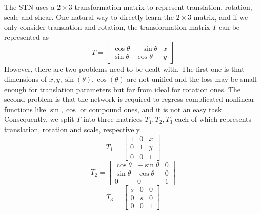 \documentclass[10pt,conference,a4paper]{IEEEtran}
\begin{document}
	The STN uses a $2 \times 3$ transformation matrix to represent translation, rotation, scale and shear. One natural way to directly learn the $2 \times 3$ matrix, and if we only consider translation and rotation, the transformation matrix $T$ can be represented as 
	\begin{equation}
		T = 
		\begin{bmatrix}
		\cos\theta & -\sin\theta & x\\ 
		\sin\theta & \cos\theta & y
		\end{bmatrix}
	\end{equation}
	However, there are two problems need to be dealt with. The first one is that dimensions of $x, y, \sin(\theta), \cos(\theta)$ are not unified and the loss may be small enough for translation parameters but far from ideal for rotation ones. The second problem is that the network is required to regress complicated nonlinear functions like $\sin, \cos$ or compound ones, and it is not an easy task. Consequently, we split $T$ into three matrices $T_1, T_2, T_3$ each of which represents translation, rotation and scale, respectively.
	\begin{equation}
		T_1 = 
		\begin{bmatrix}
		1 & 0 & x\\
		0 & 1 & y\\
		0 & 0 & 1
		\end{bmatrix}
	\end{equation}
	\begin{equation}
		T_2 = 
		\begin{bmatrix}
		\cos\theta & -\sin\theta & 0\\
		\sin\theta & \cos\theta & 0\\
		0 & 0 & 1
		\end{bmatrix}
	\end{equation}
	\begin{equation}
	T_3 = 
	\begin{bmatrix}
	s & 0 & 0\\
	0 & s & 0\\
	0 & 0 & 1
	\end{bmatrix}
	\end{equation}
\end{document}
